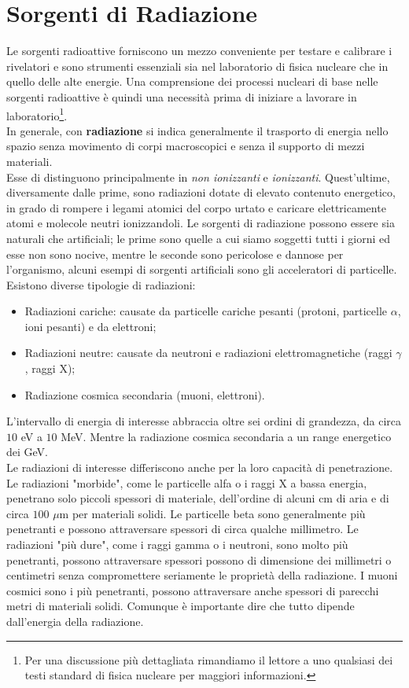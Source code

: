 \documentclass[12pt, letterpaper]{book}
\begin{document}
\chapter{Sorgenti di Radiazione}
Le sorgenti radioattive forniscono un mezzo conveniente per testare e calibrare i rivelatori e sono strumenti essenziali sia nel laboratorio di fisica nucleare che in quello delle alte energie. Una comprensione dei processi nucleari di base nelle sorgenti radioattive è quindi una necessità prima di iniziare a lavorare in laboratorio\footnote{Per una discussione più dettagliata rimandiamo il lettore a uno qualsiasi dei testi standard di fisica nucleare per maggiori informazioni.}.\\
In generale, con \textbf{radiazione} si indica generalmente il trasporto di energia nello spazio senza movimento di corpi macroscopici e senza il supporto di mezzi materiali.\\
Esse di distinguono principalmente in \textit{non ionizzanti} e \textit{ionizzanti}. Quest’ultime, diversamente dalle prime, sono radiazioni dotate di elevato contenuto energetico, in grado di rompere i legami atomici del corpo urtato e caricare elettricamente atomi e molecole neutri ionizzandoli. Le sorgenti di radiazione possono essere sia naturali che artificiali; le prime sono quelle a cui siamo soggetti tutti i giorni ed esse non sono nocive, mentre le seconde sono pericolose e dannose per l'organismo, alcuni esempi di sorgenti artificiali sono gli acceleratori di particelle.\\
Esistono diverse tipologie di radiazioni:
\begin{itemize}
    \item Radiazioni cariche: causate da particelle cariche pesanti (protoni, particelle $\alpha$, ioni pesanti) e da elettroni;
    \item Radiazioni neutre: causate da neutroni e radiazioni elettromagnetiche (raggi $\gamma$, raggi X);
    \item Radiazione cosmica secondaria (muoni, elettroni).
\end{itemize} 
L'intervallo di energia di interesse abbraccia oltre sei ordini di grandezza, da circa $10$ eV a $10$ MeV. Mentre la radiazione cosmica secondaria a un range energetico dei GeV.\\
Le radiazioni di interesse differiscono anche per la loro capacità di penetrazione. Le radiazioni "morbide", come le particelle alfa o i raggi X a bassa energia, penetrano solo piccoli spessori di materiale, dell'ordine di alcuni cm di aria e di circa $100$ $\mu$m per materiali solidi. Le particelle beta sono generalmente più penetranti e possono attraversare spessori di circa qualche millimetro.  Le radiazioni "più dure", come i raggi gamma o i neutroni, sono molto più penetranti, possono attraversare spessori possono di dimensione dei millimetri o centimetri senza compromettere seriamente le proprietà della radiazione. I muoni cosmici sono i più penetranti, possono attraversare anche spessori di parecchi metri di materiali solidi. Comunque è importante dire che tutto dipende dall'energia della radiazione.
\end{document}
